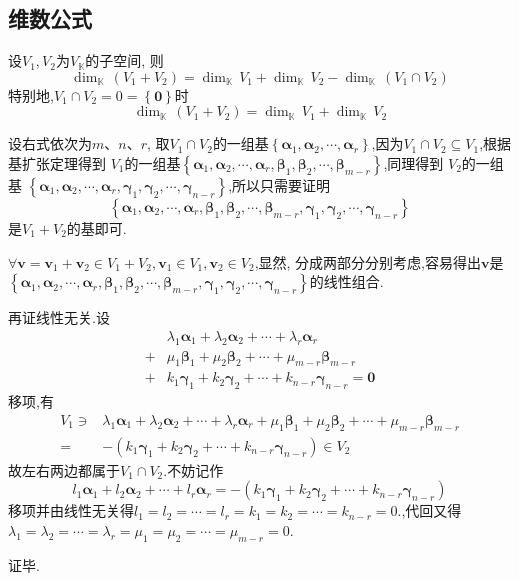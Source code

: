 \subsection{维数公式}
\begin{formal}
\begin{theorem}[子空间的维数公式]\label{thm:子空间的维数公式}
    设$V_1,V_2$为$V_{\mathbb{K}}$的子空间,
    则\[
    \dim_{\mathbb{K}}\,\left(V_1 +
    V_2\right)
    =
    \dim_{\mathbb{K}}\,V_1+
    \dim_{\mathbb{K}}\,V_2 -
    \dim_{\mathbb{K}}\,\left(
        V_1\cap V_2
    \right)
    \]
    特别地,$V_1 \cap V_2 =0=\left\{
        \bm{0}
    \right\}$时\[
    \dim_{\mathbb{K}}\,\left(V_1 +
    V_2\right)
    =
    \dim_{\mathbb{K}}\,V_1+
    \dim_{\mathbb{K}}\,V_2
    \]
\end{theorem}
\begin{Proof}
设右式依次为$m$、$n$、$r$,
取$V_1\cap V_2$的一组基$\left\{\bm{\alpha}_1,\bm{\alpha}_2,\cdots,\bm{\alpha}_r
\right\}$,因为$V_1\cap V_2\subseteq V_1$,根据基扩张定理得到
$V_1$的一组基$\left\{\bm{\alpha}_1,\bm{\alpha}_2,\cdots,\bm{\alpha}_r
,\bm{\beta}_1,\bm{\beta}_2,\cdots,\bm{\beta}_{m-r}\right\}$,同理得到
$V_2$的一组基
$\left\{\bm{\alpha}_1,\bm{\alpha}_2,\cdots,\bm{\alpha}_r
,\bm{\gamma}_1,\bm{\gamma}_2,\cdots,\bm{\gamma}_{n-r}
\right\}$,所以只需要证明
\[
\left\{\bm{\alpha}_1,\bm{\alpha}_2,\cdots,\bm{\alpha}_r
,\bm{\beta}_1,\bm{\beta}_2,\cdots,\bm{\beta}_{m-r},
\bm{\gamma}_1,\bm{\gamma}_2,\cdots,\bm{\gamma}_{n-r}\right\}
\]
是$V_1+V_2$的基即可.

$\forall \bm{v}=\bm{v}_1+\bm{v}_2\in V_1+V_2 ,
\bm{v}_1\in V_1,\bm{v}_2\in V_2$,显然,
分成两部分分别考虑,容易得出$\bm{v}$是
$\left\{\bm{\alpha}_1,\bm{\alpha}_2,\cdots,\bm{\alpha}_r
,\bm{\beta}_1,\bm{\beta}_2,\cdots,\bm{\beta}_{m-r},
\bm{\gamma}_1,\bm{\gamma}_2,\cdots,\bm{\gamma}_{n-r}\right\}
$的线性组合.

再证线性无关.设
\begin{align*}
   &\lambda_1\bm{\alpha}_1+\lambda_2\bm{\alpha}_2+\cdots+\lambda_r
\bm{\alpha}_r
\\
+&\mu_1\bm{\beta}_1+\mu_2
\bm{\beta}_2+\cdots+\mu_{m-r}
\bm{\beta}_{m-r}\\
+&k_1
\bm{\gamma}_1+k_2
\bm{\gamma}_2+\cdots+k_{n-r}\bm{\gamma}_{n-r}
 =\bm{0}
\end{align*}
移项,有
\begin{align*}
   V_1\ni&\lambda_1\bm{\alpha}_1+\lambda_2\bm{\alpha}_2+\cdots+\lambda_r
\bm{\alpha}_r
+\mu_1\bm{\beta}_1+\mu_2
\bm{\beta}_2+\cdots+\mu_{m-r}
\bm{\beta}_{m-r}\\
=&-\left(k_1
\bm{\gamma}_1+k_2
\bm{\gamma}_2+\cdots+k_{n-r}\bm{\gamma}_{n-r}
\right)\in V_2
\end{align*}
故左右两边都属于$V_1\cap V_2.$不妨记作
\[
l_1\bm{\alpha}_1+l_2\bm{\alpha}_2+\cdots+l_r\bm{\alpha}_r
=-\left(k_1
\bm{\gamma}_1+k_2
\bm{\gamma}_2+\cdots+k_{n-r}\bm{\gamma}_{n-r}
\right)
\]
移项并由线性无关得$l_1=l_2=\cdots=l_r=k_1=k_2=\cdots=k_{n-r}=0.
$,代回又得
$\lambda_1=\lambda_2=\cdots=\lambda_r=\mu_1=\mu_2=\cdots=\mu_{m-r}=0.
$

证毕.
\end{Proof}
\end{formal}
